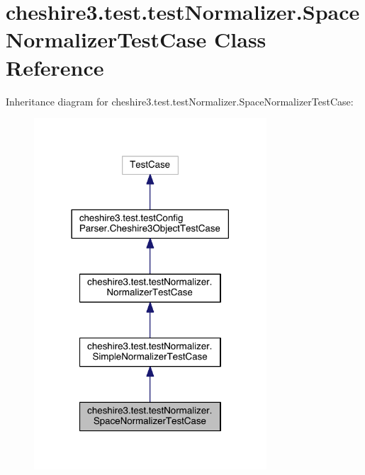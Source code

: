 \hypertarget{classcheshire3_1_1test_1_1test_normalizer_1_1_space_normalizer_test_case}{\section{cheshire3.\-test.\-test\-Normalizer.\-Space\-Normalizer\-Test\-Case Class Reference}
\label{classcheshire3_1_1test_1_1test_normalizer_1_1_space_normalizer_test_case}
}


Inheritance diagram for cheshire3.\-test.\-test\-Normalizer.\-Space\-Normalizer\-Test\-Case\-:
\nopagebreak
\begin{figure}[H]
\begin{center}
\leavevmode
\includegraphics[width=246pt]{classcheshire3_1_1test_1_1test_normalizer_1_1_space_normalizer_test_case__inherit__graph}
\end{center}
\end{figure}


